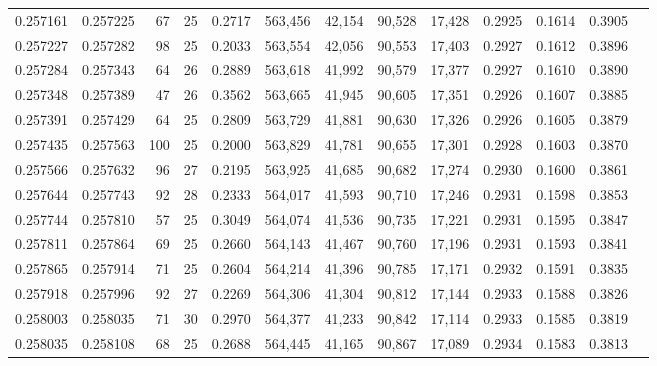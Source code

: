 \begin{tabular}{rrrrrrrrrrrrr}
0.257161 & 0.257225 &  67 &  25 &                                     0.2717 & 563,456 &  42,154 &  90,528 &  17,428 & 0.2925 & 0.1614 & 0.3905 \\
0.257227 & 0.257282 &  98 &  25 &                                     0.2033 & 563,554 &  42,056 &  90,553 &  17,403 & 0.2927 & 0.1612 & 0.3896 \\
0.257284 & 0.257343 &  64 &  26 &                                     0.2889 & 563,618 &  41,992 &  90,579 &  17,377 & 0.2927 & 0.1610 & 0.3890 \\
0.257348 & 0.257389 &  47 &  26 &                                     0.3562 & 563,665 &  41,945 &  90,605 &  17,351 & 0.2926 & 0.1607 & 0.3885 \\
0.257391 & 0.257429 &  64 &  25 &                                     0.2809 & 563,729 &  41,881 &  90,630 &  17,326 & 0.2926 & 0.1605 & 0.3879 \\
0.257435 & 0.257563 & 100 &  25 &                                     0.2000 & 563,829 &  41,781 &  90,655 &  17,301 & 0.2928 & 0.1603 & 0.3870 \\
0.257566 & 0.257632 &  96 &  27 &                                     0.2195 & 563,925 &  41,685 &  90,682 &  17,274 & 0.2930 & 0.1600 & 0.3861 \\
0.257644 & 0.257743 &  92 &  28 &                                     0.2333 & 564,017 &  41,593 &  90,710 &  17,246 & 0.2931 & 0.1598 & 0.3853 \\
0.257744 & 0.257810 &  57 &  25 &                                     0.3049 & 564,074 &  41,536 &  90,735 &  17,221 & 0.2931 & 0.1595 & 0.3847 \\
0.257811 & 0.257864 &  69 &  25 &                                     0.2660 & 564,143 &  41,467 &  90,760 &  17,196 & 0.2931 & 0.1593 & 0.3841 \\
0.257865 & 0.257914 &  71 &  25 &                                     0.2604 & 564,214 &  41,396 &  90,785 &  17,171 & 0.2932 & 0.1591 & 0.3835 \\
0.257918 & 0.257996 &  92 &  27 &                                     0.2269 & 564,306 &  41,304 &  90,812 &  17,144 & 0.2933 & 0.1588 & 0.3826 \\
0.258003 & 0.258035 &  71 &  30 &                                     0.2970 & 564,377 &  41,233 &  90,842 &  17,114 & 0.2933 & 0.1585 & 0.3819 \\
0.258035 & 0.258108 &  68 &  25 &                                     0.2688 & 564,445 &  41,165 &  90,867 &  17,089 & 0.2934 & 0.1583 & 0.3813 \\

\end{tabular}
